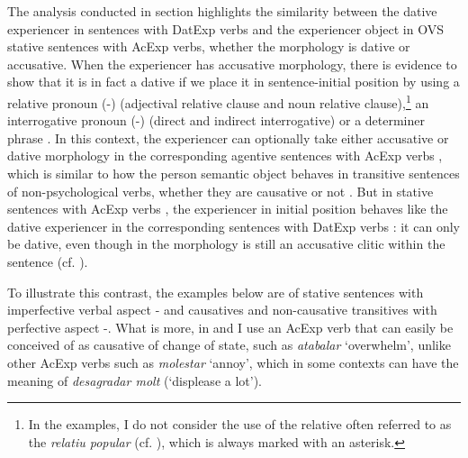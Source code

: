 \documentclass[output=paper,colorlinks,citecolor=brown,modfonts,nonflat]{langsci/langscibook}
\begin{document}
The analysis conducted in section  highlights the similarity between the dative experiencer in sentences with DatExp verbs and the experiencer object in OVS stative sentences with AcExp verbs, whether the morphology is dative or accusative. When the experiencer has accusative morphology, there is evidence to show that it is in fact a dative if we place it in sentence-initial position by using a relative pronoun (-) (adjectival relative clause and noun relative clause),\footnote{In the examples, I do not consider the use of the relative often referred to as the \textit{relatiu popular} (cf. \citealt[154--155]{Ginebra2005}), which is always marked with an asterisk.} an interrogative pronoun (-) (direct and indirect interrogative) or a determiner phrase . In this context, the experiencer can optionally take either accusative or dative morphology in the corresponding agentive sentences with AcExp verbs , which is similar to how the person semantic object behaves in transitive sentences of non-psychological verbs, whether they are causative or not . But in stative sentences with AcExp verbs , the experiencer in initial position behaves like the dative experiencer in the corresponding sentences with DatExp verbs : it can only be dative, even though in  the morphology is still an accusative clitic within the sentence (cf. \citealt[Section 4.3.4]{Royo2017}).

To illustrate this contrast, the examples below are of stative sentences with imperfective verbal aspect - and causatives and non-causative transitives with perfective aspect -. What is more, in  and  I use an AcExp verb that can easily be conceived of as causative of change of state, such as \textit{atabalar} ‘overwhelm’, unlike other AcExp verbs such as \textit{molestar} ‘annoy’, which in some contexts can have the meaning of  \textit{desagradar molt} (‘displease a lot’).

\ea%
 \label{ex:royo:14}
\end{document}
